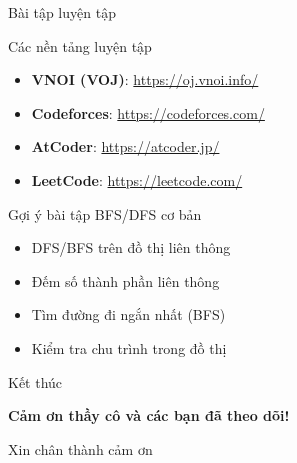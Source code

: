 \documentclass{beamer}
\begin{document}
\begin{frame}{Bài tập luyện tập}

\begin{block}{Các nền tảng luyện tập}
\begin{itemize}
    \item \textbf{VNOI (VOJ)}: 
    \url{https://oj.vnoi.info/}
    
    \item \textbf{Codeforces}: 
    \url{https://codeforces.com/}
    
    \item \textbf{AtCoder}: 
    \url{https://atcoder.jp/}
    
    \item \textbf{LeetCode}: 
    \url{https://leetcode.com/}
\end{itemize}
\end{block}

\pause

\begin{alertblock}{Gợi ý bài tập BFS/DFS cơ bản}
\begin{itemize}
    \item DFS/BFS trên đồ thị liên thông
    \item Đếm số thành phần liên thông
    \item Tìm đường đi ngắn nhất (BFS)
    \item Kiểm tra chu trình trong đồ thị
\end{itemize}
\end{alertblock}

\end{frame}

\begin{frame}{Kết thúc}
    \centering
    \vspace{0.8cm}

    {\Huge \textbf{Cảm ơn thầy cô và các bạn đã theo dõi!}}

    \vspace{1cm}
    {\Large Xin chân thành cảm ơn}

    \vspace{1.2cm}

    \vfill

\end{frame}
\end{document}
